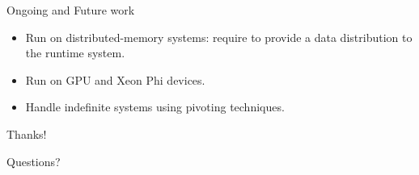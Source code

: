 \documentclass{beamer}
\newcommand{\db}[1]{\textcolor{mblue}{#1\xspace}}
\begin{document}
\begin{frame}{Ongoing and Future work}

  \begin{itemize}
  \item Run on \alert{distributed-memory} systems: require to provide
    a data distribution to the runtime system.

    \vspace{0.4cm}

  \item Run on \db{GPU} and \db{Xeon Phi} devices.

    \vspace{0.4cm}

  \item Handle \alert{indefinite} systems using pivoting techniques.
  \end{itemize}

\end{frame}

\begin{frame}[plain]{}
  \begin{center}
    \vspace{2cm}

    {\Huge Thanks!}

    \vspace{1cm}

    {\huge Questions?}

    \vspace{2cm}

  \end{center}
\end{frame}
\end{document}
